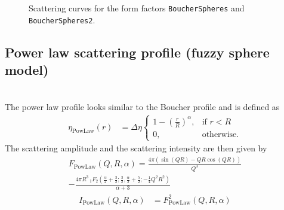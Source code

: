 \begin{figure}[htb]
\captionsetup[subfigure]{position=b}
\centering
{}
\hfill
{}
\caption{Scattering curves for the form factors \texttt{BoucherSpheres} and \texttt{BoucherSpheres2}.}
\label{fig:BoucherIQ}
\end{figure}


\subsection{Power law scattering profile (fuzzy sphere model)}
\label{sect:PowerLawSphere} ~\\
The power law profile looks similar to the Boucher profile and is defined as
\begin{align}
  \eta_\mathrm{PowLaw}(r) & = \Delta\eta
  \begin{cases}
    1-\left(\frac{r}{R}\right)^\alpha, & \mbox{if } r<R \\
    0, & \mbox{otherwise}.
  \end{cases}
\end{align}
The scattering amplitude and the scattering intensity are then given by
\begin{multline}
  F_\mathrm{PowLaw}(Q,R,\alpha)  = \frac{4 \pi  (\sin (QR)-QR \cos (QR))}{Q^3} \\
  -\frac{4 \pi  R^3 \, _1F_2\left(\frac{\alpha
   }{2}+\frac{3}{2};\frac{3}{2},\frac{\alpha }{2}+\frac{5}{2};-\frac{1}{4} Q^2R^2\right)}{\alpha+3}
\end{multline}
\begin{align}
  I_\mathrm{PowLaw}(Q,R,\alpha) &= F^2_\mathrm{PowLaw}(Q,R,\alpha)
\end{align}

